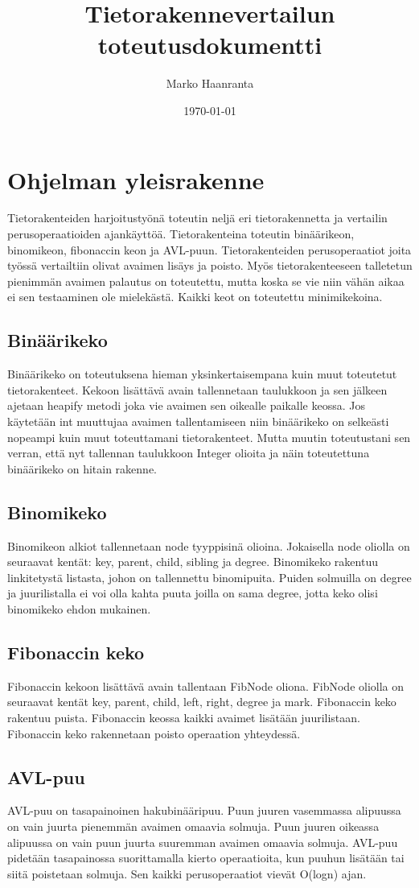 \documentclass[11pt,a4paper]{article}
\author{Marko Haanranta}
\date{\today}
\title{Tietorakennevertailun toteutusdokumentti}
\begin{document}
\maketitle
\section{Ohjelman yleisrakenne}
Tietorakenteiden harjoitustyönä toteutin neljä eri tietorakennetta ja vertailin perusoperaatioiden ajankäyttöä. Tietorakenteina toteutin binäärikeon, binomikeon, fibonaccin keon ja AVL-puun. Tietorakenteiden perusoperaatiot joita työssä vertailtiin olivat avaimen lisäys ja poisto. Myös tietorakenteeseen talletetun pienimmän avaimen palautus on toteutettu, mutta koska se vie niin vähän aikaa ei sen testaaminen ole mielekästä. Kaikki keot on toteutettu minimikekoina.
\subsection{Binäärikeko}
Binäärikeko on toteutuksena hieman yksinkertaisempana kuin muut toteutetut tietorakenteet. Kekoon lisättävä avain tallennetaan taulukkoon ja sen jälkeen ajetaan heapify metodi joka vie avaimen sen oikealle paikalle keossa. Jos käytetään int muuttujaa avaimen tallentamiseen niin binäärikeko on selkeästi nopeampi kuin muut toteuttamani tietorakenteet. Mutta muutin toteutustani sen verran, että nyt tallennan taulukkoon Integer olioita ja näin toteutettuna binäärikeko on hitain rakenne.
\subsection{Binomikeko}
Binomikeon alkiot tallennetaan node tyyppisinä olioina. Jokaisella node oliolla on seuraavat kentät: key, parent, child, sibling ja degree. Binomikeko rakentuu linkitetystä listasta, johon on tallennettu binomipuita. Puiden solmuilla on degree ja juurilistalla ei voi olla kahta puuta joilla on sama degree, jotta keko olisi binomikeko ehdon mukainen. 
\subsection{Fibonaccin keko}
Fibonaccin kekoon lisättävä avain tallentaan FibNode oliona. FibNode oliolla on seuraavat kentät key, parent, child, left, right, degree ja mark. Fibonaccin keko rakentuu puista. Fibonaccin keossa kaikki avaimet lisätään juurilistaan. Fibonaccin keko rakennetaan poisto operaation yhteydessä.
\subsection{AVL-puu}
AVL-puu on tasapainoinen hakubinääripuu. Puun juuren vasemmassa alipuussa on vain juurta pienemmän avaimen omaavia solmuja. Puun juuren oikeassa alipuussa on vain puun juurta suuremman avaimen omaavia solmuja. AVL-puu pidetään tasapainossa suorittamalla kierto operaatioita, kun puuhun lisätään tai siitä poistetaan solmuja. Sen kaikki perusoperaatiot vievät O(logn) ajan. 
\end{document}
